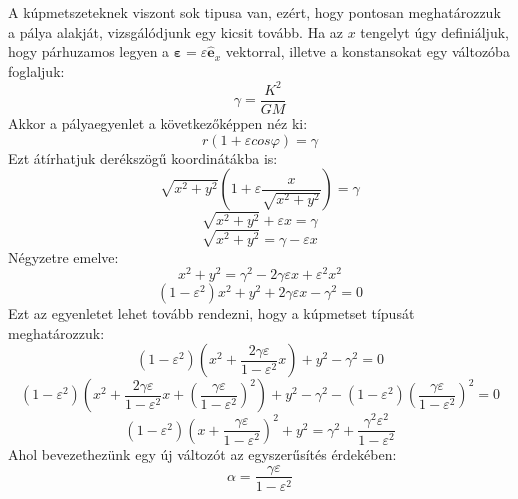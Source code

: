 \documentclass[../main.tex]{subfiles}
\begin{document}
A kúpmetszeteknek viszont sok tipusa van, ezért, hogy pontosan meghatározzuk a pálya alakját, vizsgálódjunk egy kicsit tovább.
Ha az $x$ tengelyt úgy definiáljuk, hogy párhuzamos legyen a $\boldsymbol{\varepsilon} = \varepsilon \hat{\mathbf{e}}_x$ vektorral, illetve a konstansokat egy változóba foglaljuk:
\begin{equation}
    \gamma = \frac{K^2}{GM}
\end{equation}
Akkor a pályaegyenlet a következőképpen néz ki:
\begin{equation}
    r (1 + \varepsilon cos\varphi) = \gamma
\end{equation}
Ezt átírhatjuk derékszögű koordinátákba is:
\begin{equation}
    \sqrt{x^2 + y^2} (1 + \varepsilon \frac{x}{\sqrt{x^2 + y^2}}) = \gamma
\end{equation}
\begin{equation}
    \sqrt{x^2 + y^2} + \varepsilon x = \gamma
\end{equation}
\begin{equation}
    \sqrt{x^2 + y^2} = \gamma - \varepsilon x
\end{equation}
Négyzetre emelve:
\begin{equation}
    x^2 + y^2 = \gamma^2 - 2 \gamma \varepsilon x + \varepsilon^2 x^2
\end{equation}
\begin{equation}
    (1 - \varepsilon^2) x^2 + y^2 + 2 \gamma \varepsilon x - \gamma^2 = 0
\end{equation}
Ezt az egyenletet lehet tovább rendezni, hogy a kúpmetset típusát meghatározzuk:
\begin{equation}
    (1 - \varepsilon^2) (x^2 + \frac{2 \gamma \varepsilon}{1 - \varepsilon^2} x) + y^2 - \gamma^2 = 0
\end{equation}
\begin{equation}
    (1 - \varepsilon^2) \left(x^2 + \frac{2 \gamma \varepsilon}{1 - \varepsilon^2} x + \left(\frac{\gamma \varepsilon}{1 - \varepsilon^2}\right)^2\right) + y^2 - \gamma^2 - (1 - \varepsilon^2) \left(\frac{\gamma \varepsilon}{1 - \varepsilon^2}\right)^2 = 0
\end{equation}
\begin{equation}
    (1 - \varepsilon^2) \left(x + \frac{\gamma \varepsilon}{1 - \varepsilon^2}\right)^2 + y^2 = \gamma^2 + \frac{\gamma^2 \varepsilon^2}{1 - \varepsilon^2}
\end{equation}
Ahol bevezethezünk egy új változót az egyszerűsítés érdekében:
\begin{equation}
    \alpha = \frac{\gamma \varepsilon}{1 - \varepsilon^2}
\end{equation}
\end{document}
